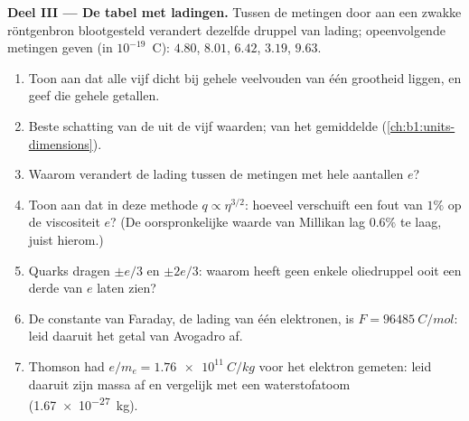 \begin{problem}
\medskip
\noindent\textbf{Deel III --- De tabel met ladingen.}
Tussen de metingen door aan een zwakke röntgenbron blootgesteld verandert dezelfde
druppel van lading; opeenvolgende metingen geven (in $10^{-19}$~C):
$4.80$, $8.01$, $6.42$, $3.19$, $9.63$.
\begin{enumerate}[resume]
  \item Toon aan dat alle vijf dicht bij gehele veelvouden van één
        grootheid liggen, en geef die gehele getallen.
  \item Beste schatting van de  uit de vijf waarden;
         van het gemiddelde (\cref{ch:b1:units-dimensions}).
  \item Waarom verandert de lading tussen de metingen met hele aantallen $e$?
  \item Toon aan dat in deze methode $q \propto \eta^{3/2}$: hoeveel verschuift
        een fout van $1\%$ op de viscositeit $e$? (De oorspronkelijke waarde van
        Millikan lag $0.6\%$ te laag, juist hierom.)
  \item Quarks dragen $\pm e/3$ en $\pm 2e/3$: waarom heeft geen enkele oliedruppel
        ooit een derde van $e$ laten zien?
  \item De constante van Faraday, de lading van één  elektronen, is
        $F = \qty{96485}{C/mol}$: leid daaruit het getal van Avogadro af.
  \item Thomson had $e/m_e = \qty{1.76e11}{C/kg}$ voor het elektron
        gemeten: leid daaruit zijn massa af en vergelijk met een waterstofatoom
        (\qty{1.67e-27}{kg}).
\end{enumerate}


\end{problem}
